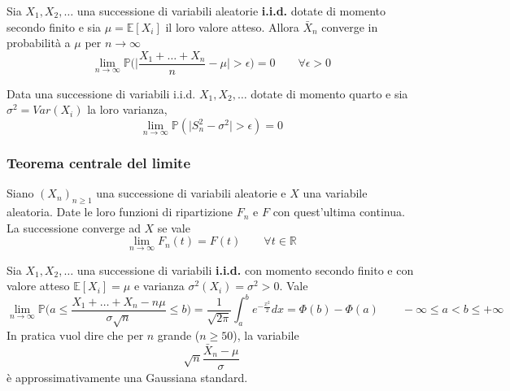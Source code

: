 \begin{theorem}
	Sia $X_1, X_2, \ldots$ una successione di variabili aleatorie \textbf{i.i.d.} dotate di momento secondo finito e sia $\mu = \mathbb{E}[X_i]$ il loro valore atteso. Allora $\bar{X}_n$ converge in probabilità a $\mu$ per $n \to \infty$
	\begin{equation}
		\lim_{n \to \infty}\mathbb{P}\bigg(\bigg\lvert\frac{X_1 + \ldots + X_n}{n}-\mu\bigg\rvert>\epsilon\bigg) = 0 \quad\quad \forall \epsilon > 0
	\end{equation}
\end{theorem}

\begin{proposition}
	Data una successione di variabili i.i.d. $X_1, X_2, \ldots$ dotate di momento quarto e sia $\sigma^2 = Var(X_i)$ la loro varianza,
	\begin{equation}
		\lim_{n \to \infty} \mathbb{P}(\lvert S^2_n - \sigma^2\rvert > \epsilon)=0
	\end{equation}
\end{proposition}

\subsubsection{Teorema centrale del limite}
\begin{proposition}
	Siano $(X_n)_{n \geq 1}$ una successione di variabili aleatorie e $X$ una variabile aleatoria. Date le loro funzioni di ripartizione $F_n$ e $F$ con quest'ultima continua. La successione converge ad $X$ se vale
	\begin{equation}
		\lim_{n \to \infty} F_n(t)=F(t) \quad\quad \forall t \in \mathbb{R}
	\end{equation}
\end{proposition}

\begin{theorem}
	Sia $X_1, X_2, \ldots$ una successione di variabili \textbf{i.i.d.} con momento secondo finito e con valore atteso $\mathbb{E}[X_i] = \mu$ e varianza $\sigma^2(X_i)=\sigma^2 > 0$. Vale
	\begin{equation}
		\lim_{n \to \infty} \mathbb{P} \bigg(a \leq \frac{X_1 + \ldots + X_n - n\mu}{\sigma \sqrt{n}} \leq b\bigg) = \frac{1}{\sqrt{2 \pi}} \int_{a}^{b}e^{-\frac{x^2}{2}}dx = \Phi(b) - \Phi(a) \quad\quad -\infty \leq a < b \leq + \infty
	\end{equation}
	In pratica vuol dire che per $n$ grande ($n \geq 50$), la variabile
	\begin{equation}
		\label{eq:tcl}
		\sqrt{n}\frac{\bar{X}_n - \mu}{\sigma}
	\end{equation}
	è approssimativamente una Gaussiana standard.
\end{theorem}

